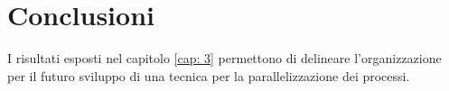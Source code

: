 \chapter{Conclusioni}
I risultati esposti nel capitolo \ref{cap: 3} permettono di delineare l'organizzazione per il futuro sviluppo di una tecnica per la parallelizzazione dei processi.